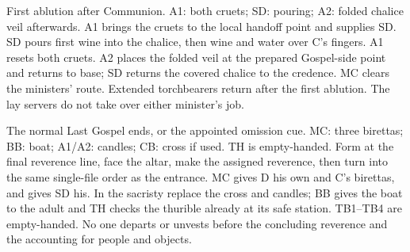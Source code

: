 {\SolemnAblutionPositions}
{First ablution after Communion.}
{A1: both cruets; SD: pouring; A2: folded chalice veil afterwards.}
{A1 brings the cruets to the local handoff point and supplies SD.
SD pours first wine into the chalice, then wine and water over C's fingers.}
{A1 resets both cruets. A2 places the folded veil at the prepared Gospel-side
point and returns to base; SD returns the covered chalice to the credence.}
{MC clears the ministers' route. Extended torchbearers return after the
first ablution. The lay servers do not take over either minister's job.}

{\SungDeparturePositions}
{The normal Last Gospel ends, or the appointed omission cue.}
{MC: three birettas; BB: boat; A1/A2: candles; CB: cross if used. TH is empty-handed.}
{Form at the final reverence line, face the altar, make the assigned
reverence, then turn into the same single-file order as the entrance.}
{MC gives D his own and C's birettas, and gives SD his. In the sacristy
replace the cross and candles; BB gives the boat to the adult and TH checks
the thurible already at its safe station.}
{TB1--TB4 are empty-handed. No one departs or unvests before the
concluding reverence and the accounting for people and objects.}
\fi
